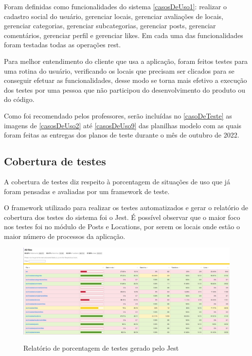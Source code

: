 Foram definidas como funcionalidades do sistema \autoref{casosDeUso1}: realizar o cadastro social do usuário, gerenciar locais, gerenciar avaliações de locais, gerenciar categorias, gerenciar subcategorias, gerenciar posts, gerenciar comentários, gerenciar perfil e gerenciar likes. Em cada uma das funcionalidades foram testadas todas as operações \ac{rest}.

Para melhor entendimento do cliente que usa a aplicação, foram feitos testes para uma rotina do usuário, verificando os locais que precisam ser clicados para se conseguir efetuar as funcionalidades, desse modo se torna mais efetivo a execução dos testes por uma pessoa que não participou do desenvolvimento do produto ou do código. 

Como foi recomendado pelos professores, serão incluídas no \autoref{casoDeTeste} as imagens  de \autoref{casosDeUso2} até \autoref{casosDeUso9} das planilhas modelo com as quais foram feitas as entregas dos planos de teste durante o mês de outubro de 2022.



\subsection{Cobertura de testes}

A cobertura de testes diz respeito à porcentagem de situações de uso que já foram pensadas e avaliadas por um framework de teste.

O framework utilizado para realizar os testes automatizados e gerar o relatório de cobertura dos testes do sistema foi o Jest. É possível observar que o maior foco nos testes foi no módulo de Posts e Locations, por serem os locais onde estão o maior número de processos da aplicação. \pagebreak

\begin{figure}[htb]
	\centering
	\caption{\label{fig_arq_virado}Relatório de porcentagem de testes gerado pelo Jest}
	\includegraphics[width=1.00\textwidth]{anexos/biggerTest.png}
	\label{testsPart1}
\end{figure}


